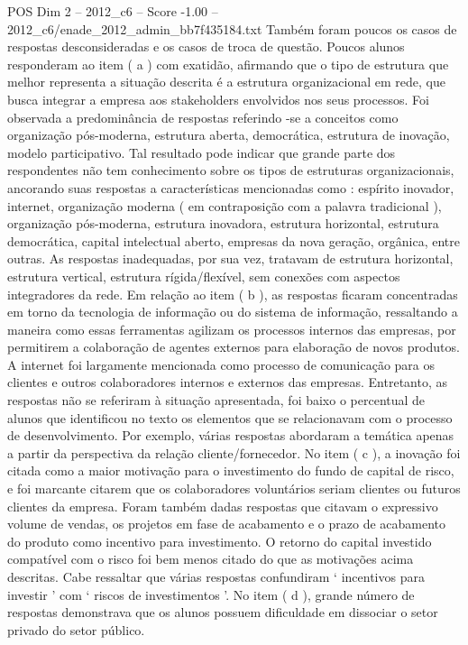 \begin{textsample}{POS Dim 2 – 2012\_c6 – Score -1.00 – 2012\_c6/enade\_2012\_admin\_bb7f435184.txt}
Também foram poucos os casos de respostas desconsideradas e os casos de troca de questão.
Poucos alunos responderam ao item ( a ) com exatidão, afirmando que o tipo de estrutura que melhor representa a situação descrita é a estrutura organizacional em rede, que busca integrar a empresa aos stakeholders envolvidos nos seus processos.
Foi observada a predominância de respostas referindo -se a conceitos como organização pós-moderna, estrutura aberta, democrática, estrutura de inovação, modelo participativo.
Tal resultado pode indicar que grande parte dos respondentes não tem conhecimento sobre os tipos de estruturas organizacionais, ancorando suas respostas a características mencionadas como : espírito inovador, internet, organização moderna ( em contraposição com a palavra tradicional ), organização pós-moderna, estrutura inovadora, estrutura horizontal, estrutura democrática, capital intelectual aberto, empresas da nova geração, orgânica, entre outras.
As respostas inadequadas, por sua vez, tratavam de estrutura horizontal, estrutura vertical, estrutura rígida/flexível, sem conexões com aspectos integradores da rede.
Em relação ao item ( b ), as respostas ficaram concentradas em torno da tecnologia de informação ou do sistema de informação, ressaltando a maneira como essas ferramentas agilizam os processos internos das empresas, por permitirem a colaboração de agentes externos para elaboração de novos produtos.
A internet foi largamente mencionada como processo de comunicação para os clientes e outros colaboradores internos e externos das empresas.
Entretanto, as respostas não se referiram à situação apresentada, foi baixo o percentual de alunos que identificou no texto os elementos que se relacionavam com o processo de desenvolvimento.
Por exemplo, várias respostas abordaram a temática apenas a partir da perspectiva da relação cliente/fornecedor.
No item ( c ), a inovação foi citada como a maior motivação para o investimento do fundo de capital de risco, e foi marcante citarem que os colaboradores voluntários seriam clientes ou futuros clientes da empresa.
Foram também dadas respostas que citavam o expressivo volume de vendas, os projetos em fase de acabamento e o prazo de acabamento do produto como incentivo para investimento.
O retorno do capital investido compatível com o risco foi bem menos citado do que as motivações acima descritas.
Cabe ressaltar que várias respostas confundiram ‘ incentivos para investir ’ com ‘ riscos de investimentos ’.
No item ( d ), grande número de respostas demonstrava que os alunos possuem dificuldade em dissociar o setor privado do setor público.

\end{textsample}
